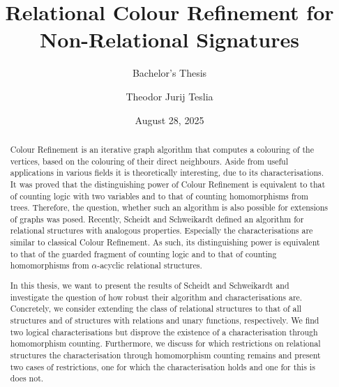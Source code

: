 \documentclass[a4paper,11pt,DIV=15]{scrartcl} %
\theoremstyle{plain}
\theoremstyle{definition}
\begin{document}
\subtitle{Bachelor's Thesis}
\date{August 28, 2025}
\publishers{RWTH Aachen University}	%

\title{Relational Colour Refinement for Non-Relational Signatures}

\author{Theodor Jurij Teslia}

\maketitle

\begin{abstract}
	Colour Refinement is an iterative graph algorithm that computes a colouring of the vertices, based on the colouring of their direct neighbours.
	Aside from useful applications in various fields it is theoretically interesting, due to its characterisations.
	It was proved that the distinguishing power of Colour Refinement is equivalent to that of counting logic with two variables and to that of counting homomorphisms from trees.
	Therefore, the question, whether such an algorithm is also possible for extensions of graphs was posed.
	Recently, Scheidt and Schweikardt defined an algorithm for relational structures with analogous properties.
	Especially the characterisations are similar to classical Colour Refinement.
	As such, its distinguishing power is equivalent to that of the guarded fragment of counting logic and to that of counting homomorphisms from $\alpha$-acyclic relational structures.
	
	In this thesis, we want to present the results of Scheidt and Schweikardt and investigate the question of how robust their algorithm and characterisations are.
	Concretely, we consider extending the class of relational structures to that of all structures and of structures with relations and unary functions, respectively.
	We find two logical characterisations but disprove the existence of a characterisation through homomorphism counting.
	Furthermore, we discuss for which restrictions on relational structures the characterisation through homomorphism counting remains and present two cases of restrictions, one for which the characterisation holds and one for this is does not.
\end{abstract}

\thispagestyle{empty}

\clearpage















\clearpage



\end{document}
